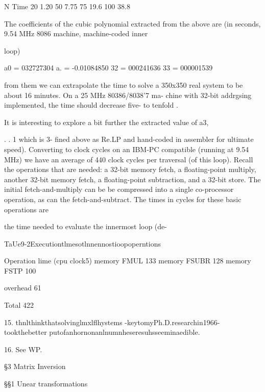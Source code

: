 { 

N Time
20 1.20
50 7.75
75 19.6
100 38.8

 

 

 

The coefficients of the cubic polynomial extracted from the above
are (in seconds, 9.54 MHz 8086 machine, machine-coded inner

loop)

a0 = 032727304
a. = -0.01084850
32 = 000241636
33 = 000001539

from them we can extrapolate the time to solve a 350x350 real
system to be about 16 minutes. On a 25 MHz 80386/8038'7 ma-
chine with 32-bit addrgsing implemented, the time should
decrease five- to tenfold .

It is interesting to explore a bit further the extracted value of a3,

. . 1
which is 3-
fined above as Re.LP and hand-coded in assembler for ultimate
speed). Converting to clock cycles on an IBM-PC compatible
(running at 9.54 MHz) we have an average of 440 clock cycles per
traversal (of this loop). Recall the operations that are needed: a
32-bit memory fetch, a floating-point multiply, another 32-bit
memory fetch, a floating-point subtraction, and a 32-bit store.
The initial fetch-and-multiply can be be compressed into a single
co-processor operation, as can the fetch-and-subtract. The times
in cycles for these basic operations are

the time needed to evaluate the innermost loop (de-

TaUe9-2Executiontlmesotlnnennostioopoperntions

 

Operation lime (cpu clock5)
memory FMUL 133
memory FSUBR 128
memory FSTP 100

overhead 61

 

Total 422

 

 

 

 

15. thnlthinkthatsolvinglmxlflhystems -keytomyPh.D.researchin1966- tookthebetter
putofanhornonanlnumnheseresuhsseeminaedible.

16. See WP.



\S3 Matrix Inversion

\S\S1 Unear transformations

}
